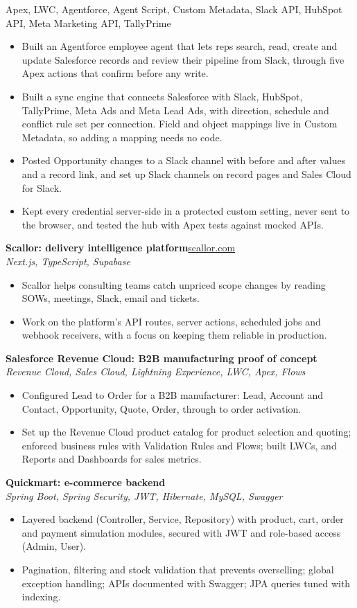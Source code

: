 \documentclass[10pt,a4paper]{article}
\newcommand{\project}[3]{%
  \textbf{#1}\hfill {\small #2}\\
  {\small\color{soft}\textit{#3}}\par}
\begin{document}
  {Apex, LWC, Agentforce, Agent Script, Custom Metadata, Slack API, HubSpot API, Meta Marketing API, TallyPrime}
\begin{itemize}
  \item Built an Agentforce employee agent that lets reps search, read, create and update Salesforce
        records and review their pipeline from Slack, through five Apex actions that confirm
        before any write.
  \item Built a sync engine that connects Salesforce with Slack, HubSpot, TallyPrime, Meta Ads and Meta
        Lead Ads, with direction, schedule and conflict rule set per connection. Field and object
        mappings live in Custom Metadata, so adding a mapping needs no code.
  \item Posted Opportunity changes to a Slack channel with before and after values and a record link,
        and set up Slack channels on record pages and Sales Cloud for Slack.
  \item Kept every credential server-side in a protected custom setting, never sent to the browser,
        and tested the hub with Apex tests against mocked APIs.
\end{itemize}
\vspace{4pt}
\project{Scallor: delivery intelligence platform}{\href{https://scallor.com}{\textcolor{accent}{scallor.com}}}
  {Next.js, TypeScript, Supabase}
\begin{itemize}
  \item Scallor helps consulting teams catch unpriced scope changes by reading SOWs, meetings, Slack,
        email and tickets.
  \item Work on the platform's API routes, server actions, scheduled jobs and webhook receivers, with
        a focus on keeping them reliable in production.
\end{itemize}
\vspace{4pt}
\project{Salesforce Revenue Cloud: B2B manufacturing proof of concept}{}
  {Revenue Cloud, Sales Cloud, Lightning Experience, LWC, Apex, Flows}
\begin{itemize}
  \item Configured Lead to Order for a B2B manufacturer: Lead, Account and Contact, Opportunity, Quote,
        Order, through to order activation.
  \item Set up the Revenue Cloud product catalog for product selection and quoting; enforced business
        rules with Validation Rules and Flows; built LWCs, and Reports and Dashboards for sales metrics.
\end{itemize}
\vspace{4pt}
\project{Quickmart: e-commerce backend}{}
  {Spring Boot, Spring Security, JWT, Hibernate, MySQL, Swagger}
\begin{itemize}
  \item Layered backend (Controller, Service, Repository) with product, cart, order and payment
        simulation modules, secured with JWT and role-based access (Admin, User).
  \item Pagination, filtering and stock validation that prevents overselling; global exception
        handling; APIs documented with Swagger; JPA queries tuned with indexing.
\end{itemize}
\end{document}
